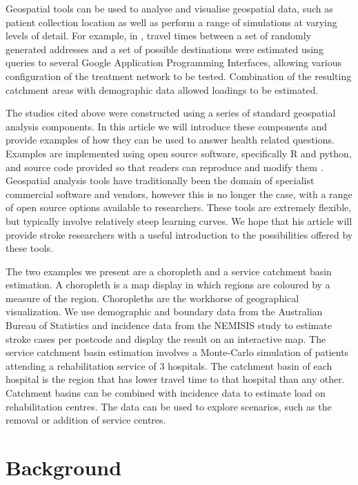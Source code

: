 \documentclass[utf8]{frontiersHLTH}
\begin{document}
Geospatial tools can be used to analyse and visualise geospatial data,
such as patient collection location as well as perform a range of
simulations at varying levels of detail. For example, in
\cite{Phan_2017}, travel times between a set of randomly generated
addresses and a set of possible destinations were estimated using
queries to several Google Application Programming Interfaces, allowing
various configuration of the treatment network to be
tested. Combination of the resulting catchment areas with demographic
data allowed loadings to be estimated.

The studies cited above were constructed using a series of standard
geospatial analysis components. In this article we will introduce
these components and provide examples of how they can be used to
answer health related questions. Examples are implemented using open
source software, specifically R and python, and source code provided
so that readers can reproduce and modify them
\cite{R_Core_Team_2018,sanner1999python}. Geospatial analysis tools
have traditionally been the domain of specialist commercial software
and vendors, however this is no longer the case, with a range of open
source options available to researchers.  These tools are extremely
flexible, but typically involve relatively steep learning curves. We
hope that his article will provide stroke researchers with a useful
introduction to the possibilities offered by these tools.

The two examples we present are a choropleth and a service catchment
basin estimation. A choropleth is a map display in which regions are
coloured by a measure of the region. Choropleths are the workhorse of
geographical visualization. We use demographic and boundary data from
the Australian Bureau of Statistics and incidence data from the
NEMISIS \cite{thrift_stroke_2000,azarpazhooh2008patterns} study to
estimate stroke cases per postcode and display the result on an
interactive map. The service catchment basin estimation involves a
Monte-Carlo simulation of patients attending a rehabilitation service
of 3 hospitals. The catchment basin of each hospital is the region
that has lower travel time to that hospital than any other.  Catchment
basins can be combined with incidence data to estimate load on
rehabilitation centres. The data can be used to explore scenarios,
such as the removal or addition of service centres.

\section{Background}\label{background}
\end{document}
